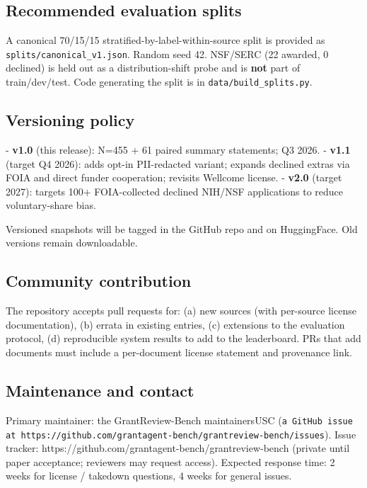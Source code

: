 \documentclass[11pt]{article}
\begin{document}
\subsection{Recommended evaluation splits}

A canonical 70/15/15 stratified-by-label-within-source split is provided as \texttt{splits/canonical\_v1.json}. Random seed 42. NSF/SERC (22 awarded, 0 declined) is held out as a distribution-shift probe and is \textbf{not} part of train/dev/test. Code generating the split is in \texttt{data/build\_splits.py}.

\subsection{Versioning policy}

- \textbf{v1.0} (this release): N=455 + 61 paired summary statements; Q3 2026.
- \textbf{v1.1} (target Q4 2026): adds opt-in PII-redacted variant; expands declined extras via FOIA and direct funder cooperation; revisits Wellcome license.
- \textbf{v2.0} (target 2027): targets 100+ FOIA-collected declined NIH/NSF applications to reduce voluntary-share bias.

Versioned snapshots will be tagged in the GitHub repo and on HuggingFace. Old versions remain downloadable.

\subsection{Community contribution}

The repository accepts pull requests for: (a) new sources (with per-source license documentation), (b) errata in existing entries, (c) extensions to the evaluation protocol, (d) reproducible system results to add to the leaderboard. PRs that add documents must include a per-document license statement and provenance link.

\subsection{Maintenance and contact}

Primary maintainer: the GrantReview-Bench maintainersUSC (\texttt{a GitHub issue at https://github.com/grantagent-bench/grantreview-bench/issues}). Issue tracker: https://github.com/grantagent-bench/grantreview-bench (private until paper acceptance; reviewers may request access). Expected response time: 2 weeks for license / takedown questions, 4 weeks for general issues.
\end{document}
